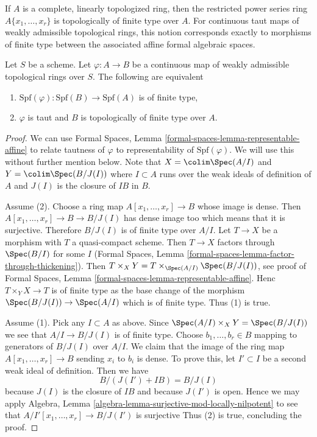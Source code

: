 \noindent
If $A$ is a complete, linearly topologized ring, then the restricted
power series ring $A\{x_1, \ldots, x_r\}$ is topologically of finite
type over $A$. For continuous taut maps of weakly admissible topological rings,
this notion corresponds exactly to morphisms of finite type
between the associated affine formal algebraic spaces.

\begin{lemma}
\label{lemma-topologically-finite-type-finite-type}
Let $S$ be a scheme. Let $\varphi : A \to B$ be a continuous map of
weakly admissible topological rings over $S$. The following
are equivalent
\begin{enumerate}
\item $\text{Spf}(\varphi) : \text{Spf}(B) \to \text{Spf}(A)$
is of finite type,
\item $\varphi$ is taut and $B$ is topologically of finite type over $A$.
\end{enumerate}
\end{lemma}

\begin{proof}
We can use Formal Spaces, Lemma \ref{formal-spaces-lemma-representable-affine}
to relate tautness of $\varphi$ to representability of
$\text{Spf}(\varphi)$. We will use this without further mention below.
Note that $X = \colim \Spec(A/I)$ and $Y = \colim \Spec(B/J(I))$
where $I \subset A$ runs over the weak ideals of definition of $A$
and $J(I)$ is the closure of $IB$ in $B$.

\medskip\noindent
Assume (2).
Choose a ring map $A[x_1, \ldots, x_r] \to B$ whose image is dense.
Then $A[x_1, \ldots, x_r] \to B \to B/J(I)$ has dense image too
which means that it is surjective. Therefore $B/J(I)$ is of
finite type over $A/I$. Let $T \to X$ be a morphism with
$T$ a quasi-compact scheme. Then $T \to X$ factors through
$\Spec(B/I)$ for some $I$ (Formal Spaces, Lemma
\ref{formal-spaces-lemma-factor-through-thickening}).
Then $T \times_X Y = T \times_{\Spec(A/I)} \Spec(B/J(I))$, see proof of
Formal Spaces, Lemma \ref{formal-spaces-lemma-representable-affine}.
Henc $T \times_Y X \to T$ is of finite type as the base change of
the morphism $\Spec(B/J(I)) \to \Spec(A/I)$ which is of finite
type. Thus (1) is true.

\medskip\noindent
Assume (1). Pick any $I \subset A$ as above. Since
$\Spec(A/I) \times_X Y = \Spec(B/J(I))$ we see that $A/I \to B/J(I)$
is of finite type. Choose $b_1, \ldots, b_r \in B$
mapping to generators of $B/J(I)$ over $A/I$. We claim that the image
of the ring map $A[x_1, \ldots, x_r] \to B$ sending $x_i$ to $b_i$
is dense. To prove this, let $I' \subset I$ be a second weak ideal
of definition. Then we have
$$
B/(J(I') + IB) = B/J(I)
$$
because $J(I)$ is the closure of $IB$ and because $J(I')$ is open.
Hence we may apply Algebra, Lemma
\ref{algebra-lemma-surjective-mod-locally-nilpotent}
to see that $A/I'[x_1, \ldots, x_r] \to B/J(I')$ is surjective
Thus (2) is true, concluding the proof.
\end{proof}

